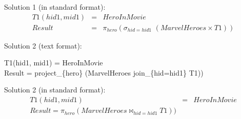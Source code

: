 \documentclass[11pt]{article}
\begin{document}
Solution 1 (in standard format):
\begin{eqnarray*}
T1(hid1, mid1) & =  & HeroInMovie \\
Result &  = & \pi_{hero} (\sigma_{hid=hid1}\,\, (MarvelHeroes \times T1)) 
\end{eqnarray*}

Solution 2 (text format):

T1(hid1, mid1) = HeroInMovie \\
Result = project\_\{hero\} (MarvelHeroes join\_\{hid=hid1\}  T1))

Solution 2 (in standard format):
\begin{eqnarray*}
T1(hid1, mid1) & = & HeroInMovie \\
Result = \pi_{hero} (MarvelHeroes \bowtie_{hid=hid1}  T1))
\end{eqnarray*}
\end{document}
